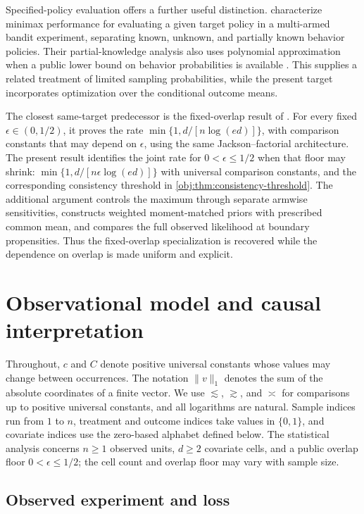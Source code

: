 \documentclass[11pt]{article}
\begin{document}
Specified-policy evaluation offers a further useful distinction. \citet{Ma2022} characterize minimax performance for evaluating a given target policy in a multi-armed bandit experiment, separating known, unknown, and partially known behavior policies. Their partial-knowledge analysis also uses polynomial approximation when a public lower bound on behavior probabilities is available \citep[Section~3.3]{Ma2022}. This supplies a related treatment of limited sampling probabilities, while the present target incorporates optimization over the conditional outcome means.

The closest same-target predecessor is the fixed-overlap result of \citet[Theorem~3]{CausalSmithFixedOverlap2026}. For every fixed \(\epsilon\in(0,1/2)\), it proves the rate \(\min\{1,d/[n\log(ed)]\}\), with comparison constants that may depend on \(\epsilon\), using the same Jackson--factorial architecture. The present result identifies the joint rate for \(0<\epsilon\le1/2\) when that floor may shrink: \(\min\{1,d/[n\epsilon\log(ed)]\}\) with universal comparison constants, and the corresponding consistency threshold in \cref{obj:thm:consistency-threshold}. The additional argument controls the maximum through separate armwise sensitivities, constructs weighted moment-matched priors with prescribed common mean, and compares the full observed likelihood at boundary propensities. Thus the fixed-overlap specialization is recovered while the dependence on overlap is made uniform and explicit.


\section{Observational model and causal interpretation}

Throughout, \(c\) and \(C\) denote positive universal constants whose values may change between occurrences. The notation \(\|v\|_1\) denotes the sum of the absolute coordinates of a finite vector. We use \(\lesssim\), \(\gtrsim\), and \(\asymp\) for comparisons up to positive universal constants, and all logarithms are natural. Sample indices run from \(1\) to \(n\), treatment and outcome indices take values in \(\{0,1\}\), and covariate indices use the zero-based alphabet defined below. The statistical analysis concerns \(n\ge1\) observed units, \(d\ge2\) covariate cells, and a public overlap floor \(0<\epsilon\le1/2\); the cell count and overlap floor may vary with sample size.

\subsection{Observed experiment and loss}
\end{document}
